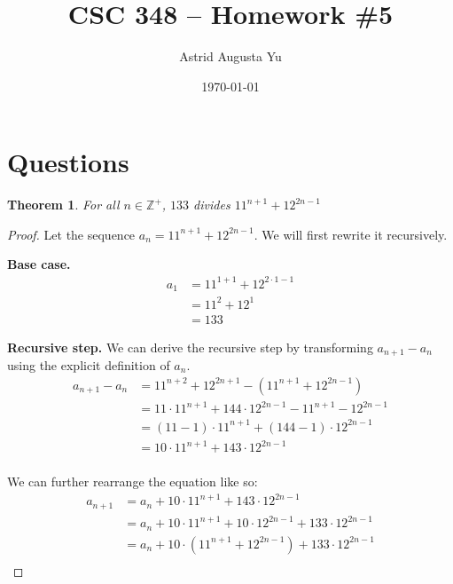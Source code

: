 \documentclass{article}
\author{Astrid Augusta Yu}
\title{CSC 348 -- Homework \#5}
\date{\today}
\newtheorem{theorem}{Theorem}
\numberwithin{subcase}{case}
\begin{document}
\maketitle
\tableofcontents

\section{Questions}
\begin{outline}[enumerate]
    \1 \begin{theorem}
        For all $n \in \mathbb{Z}^+$, $133$ divides $11^{n+1} + 12^{2n-1}$
    \end{theorem}
    \begin{proof}
        Let the sequence $a_n = 11^{n+1} + 12^{2n-1}$. We will first rewrite it 
        recursively.

        \textbf{Base case.}
        \begin{equation}
            \begin{aligned}
                a_1 &= 11^{1+1} +12^{2\cdot 1 - 1} \\
                &= 11^2 + 12^1  \\
                &= 133
            \end{aligned}
            \label{eqn:133-recb}
        \end{equation}

        \textbf{Recursive step.} We can derive the recursive step by transforming $a_{n+1} - a_n$ using the 
        explicit definition of $a_n$.
        \begin{equation}
            \begin{aligned}
                a_{n+1}-a_n &= 11^{n+2} + 12^{2n+1} - \left(11^{n+1} + 12^{2n-1}\right)  \\
                &= 11\cdot 11^{n+1} + 144\cdot 12^{2n-1} - 11^{n+1} - 12^{2n-1}  \\
                &= (11 - 1)\cdot 11^{n+1} + (144 - 1)\cdot 12^{2n-1}  \\ 
                &= 10\cdot 11^{n+1} + 143\cdot 12^{2n-1}  \\
            \end{aligned}
            \label{eqn:133-rec1}
        \end{equation}

        We can further rearrange the equation like so:        
        \begin{equation}
            \begin{aligned}
                a_{n+1}&= a_n + 10\cdot 11^{n+1} + 143\cdot 12^{2n-1}  \\
                &= a_n + 10\cdot 11^{n+1} + 10\cdot 12^{2n-1} + 133\cdot 12^{2n-1}\\
                &= a_n + 10\cdot \left(11^{n+1} + 12^{2n-1}\right) + 133\cdot 12^{2n-1}\\
            \end{aligned}
            \label{eqn:133-rec2}
        \end{equation}


\end{proof}
\end{outline}
\end{document}
